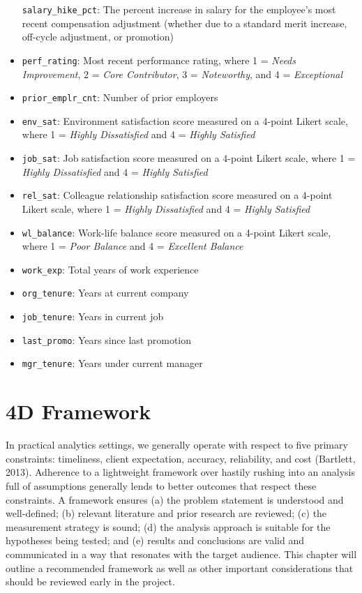 \documentclass[]{book}
\begin{document}
\begin{itemize}
  \texttt{salary\_hike\_pct}: The percent increase in salary for the employee's most recent compensation adjustment (whether due to a standard merit increase, off-cycle adjustment, or promotion)
\item
  \texttt{perf\_rating}: Most recent performance rating, where 1 = \emph{Needs Improvement}, 2 = \emph{Core Contributor}, 3 = \emph{Noteworthy}, and 4 = \emph{Exceptional}
\item
  \texttt{prior\_emplr\_cnt}: Number of prior employers
\item
  \texttt{env\_sat}: Environment satisfaction score measured on a 4-point Likert scale, where 1 = \emph{Highly Dissatisfied} and 4 = \emph{Highly Satisfied}
\item
  \texttt{job\_sat}: Job satisfaction score measured on a 4-point Likert scale, where 1 = \emph{Highly Dissatisfied} and 4 = \emph{Highly Satisfied}
\item
  \texttt{rel\_sat}: Colleague relationship satisfaction score measured on a 4-point Likert scale, where 1 = \emph{Highly Dissatisfied} and 4 = \emph{Highly Satisfied}
\item
  \texttt{wl\_balance}: Work-life balance score measured on a 4-point Likert scale, where 1 = \emph{Poor Balance} and 4 = \emph{Excellent Balance}
\item
  \texttt{work\_exp}: Total years of work experience
\item
  \texttt{org\_tenure}: Years at current company
\item
  \texttt{job\_tenure}: Years in current job
\item
  \texttt{last\_promo}: Years since last promotion
\item
  \texttt{mgr\_tenure}: Years under current manager
\end{itemize}

\hypertarget{d-framework}{%
\section{4D Framework}\label{d-framework}}

In practical analytics settings, we generally operate with respect to five primary constraints: timeliness, client expectation, accuracy, reliability, and cost (Bartlett, 2013). Adherence to a lightweight framework over hastily rushing into an analysis full of assumptions generally lends to better outcomes that respect these constraints. A framework ensures (a) the problem statement is understood and well-defined; (b) relevant literature and prior research are reviewed; (c) the measurement strategy is sound; (d) the analysis approach is suitable for the hypotheses being tested; and (e) results and conclusions are valid and communicated in a way that resonates with the target audience. This chapter will outline a recommended framework as well as other important considerations that should be reviewed early in the project.
\end{document}
